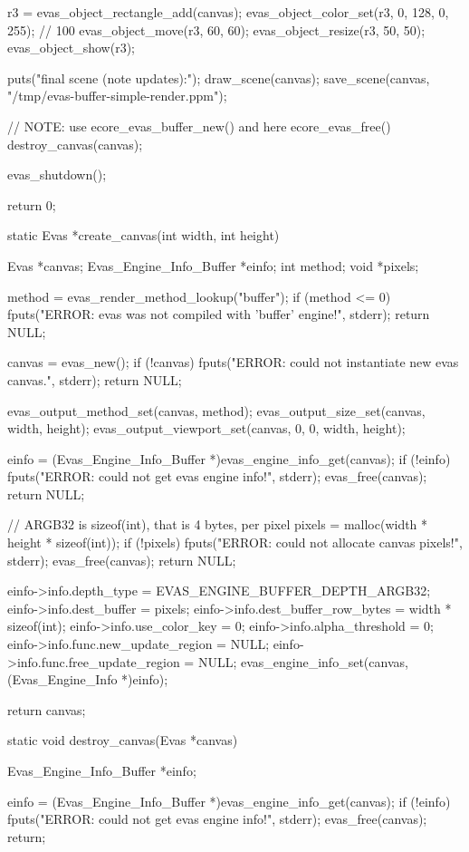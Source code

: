 \begin{DoxyCodeInclude}
{   r3 = evas_object_rectangle_add(canvas);
   evas_object_color_set(r3, 0, 128, 0, 255); // 100%
   evas_object_move(r3, 60, 60);
   evas_object_resize(r3, 50, 50);
   evas_object_show(r3);

   puts("final scene (note updates):");
   draw_scene(canvas);
   save_scene(canvas, "/tmp/evas-buffer-simple-render.ppm");

   // NOTE: use ecore_evas_buffer_new() and here ecore_evas_free()
   destroy_canvas(canvas);

   evas_shutdown();

   return 0;
}

static Evas *create_canvas(int width, int height)
{
   Evas *canvas;
   Evas_Engine_Info_Buffer *einfo;
   int method;
   void *pixels;

   method = evas_render_method_lookup("buffer");
   if (method <= 0)
     {
        fputs("ERROR: evas was not compiled with 'buffer' engine!\n", stderr);
        return NULL;
     }

   canvas = evas_new();
   if (!canvas)
     {
        fputs("ERROR: could not instantiate new evas canvas.\n", stderr);
        return NULL;
     }

   evas_output_method_set(canvas, method);
   evas_output_size_set(canvas, width, height);
   evas_output_viewport_set(canvas, 0, 0, width, height);

   einfo = (Evas_Engine_Info_Buffer *)evas_engine_info_get(canvas);
   if (!einfo)
     {
        fputs("ERROR: could not get evas engine info!\n", stderr);
        evas_free(canvas);
        return NULL;
     }

   // ARGB32 is sizeof(int), that is 4 bytes, per pixel
   pixels = malloc(width * height * sizeof(int));
   if (!pixels)
     {
        fputs("ERROR: could not allocate canvas pixels!\n", stderr);
        evas_free(canvas);
        return NULL;
     }

   einfo->info.depth_type = EVAS_ENGINE_BUFFER_DEPTH_ARGB32;
   einfo->info.dest_buffer = pixels;
   einfo->info.dest_buffer_row_bytes = width * sizeof(int);
   einfo->info.use_color_key = 0;
   einfo->info.alpha_threshold = 0;
   einfo->info.func.new_update_region = NULL;
   einfo->info.func.free_update_region = NULL;
   evas_engine_info_set(canvas, (Evas_Engine_Info *)einfo);

   return canvas;
}

static void destroy_canvas(Evas *canvas)
{
   Evas_Engine_Info_Buffer *einfo;

   einfo = (Evas_Engine_Info_Buffer *)evas_engine_info_get(canvas);
   if (!einfo)
     {
        fputs("ERROR: could not get evas engine info!\n", stderr);
        evas_free(canvas);
        return;
     }

}
\end{DoxyCodeInclude}

